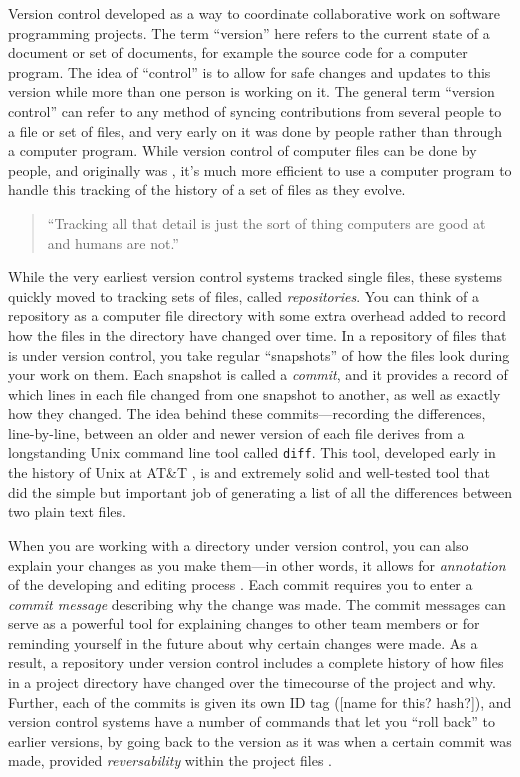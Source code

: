 \documentclass[]{tufte-book}
\begin{document}
Version control developed as a way to coordinate collaborative work on software
programming projects. The term ``version'' here refers to the current state of a
document or set of documents, for example the source code for a computer
program. The idea of ``control'' is to allow for safe changes and updates to this
version while more than one person is working on it. The general term ``version
control'' can refer to any method of syncing contributions from several people to
a file or set of files, and very early on it was done by people rather than
through a computer program. While version control of computer files can be done
by people, and originally was \citep{irving2011astonishments}, it's much more
efficient to use a computer program to handle this tracking of the history of a
set of files as they evolve.

\begin{quote}
``Tracking all that detail is just the sort of thing computers
are good at and humans are not.'' \citep{raymond2003art}
\end{quote}

While the very earliest version control systems tracked single files, these
systems quickly moved to tracking sets of files, called \emph{repositories}. You can
think of a repository as a computer file directory with some extra overhead
added to record how the files in the directory have changed over time. In a
repository of files that is under version control, you take regular ``snapshots''
of how the files look during your work on them. Each snapshot is called a
\emph{commit}, and it provides a record of which lines in each file changed from one
snapshot to another, as well as exactly how they changed. The idea behind these
commits---recording the differences, line-by-line, between an older and newer
version of each file derives from a longstanding Unix command line tool called
\texttt{diff}. This tool, developed early in the history of Unix at AT\&T
\citep{raymond2003art}, is and extremely solid and well-tested tool that did the
simple but important job of generating a list of all the differences between two
plain text files.

When you are working with a directory under version control, you can also
explain your changes as you make them---in other words, it allows for
\emph{annotation} of the developing and editing process \citep{raymondunderstanding}. Each
commit requires you to enter a \emph{commit message} describing why the change was
made. The commit messages can serve as a powerful tool for explaining changes to
other team members or for reminding yourself in the future about why certain
changes were made. As a result, a repository under version control includes a
complete history of how files in a project directory have changed over the
timecourse of the project and why. Further, each of the commits is given its own
ID tag ({[}name for this? hash?{]}), and version control systems have a number of
commands that let you ``roll back'' to earlier versions, by going back to the
version as it was when a certain commit was made, provided \emph{reversability}
within the project files \citep{raymondunderstanding}.
\end{document}
